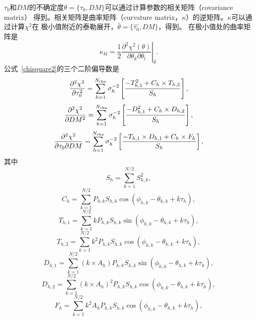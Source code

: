 $\tau_{0}$和$DM$的不确定度$\theta=\{\tau_0,DM\}$可以通过计算参数的相关矩阵（covariance matrix）
得到。相关矩阵是曲率矩阵（curvature matrix，$\kappa$）的逆矩阵。$\kappa$可以通过计算$\chi^2$在
极小值附近的泰勒展开，$\hat{\theta}=\{\hat{\tau_0},\hat{DM}\}$，得到。
%
在极小值处的曲率矩阵是
\begin{equation}
\kappa_{kl}=\left.\frac{1}{2}\frac{\partial^{2}\chi^{2}(\theta)}{\partial\theta_{k}\partial\theta_{l}}\right\rvert_{\hat{\theta}}.
\end{equation}
%
公式~\ref{chisquare2}的三个二阶偏导数是
%
\begin{equation}
\label{eq7}
\frac{\partial^2\chi^2}{\partial \tau_{0}^{2}}=\sum_{h=1}^{N_{\rm{chn}}}\sigma_{h}^{-2}\left[\frac{-T_{h,1}^{2}+C_{h}\times T_{h,2}}{S_{h}}\right],
\end{equation}
%
\begin{equation}
\frac{\partial^2\chi^2}{\partial DM^{2}}=\sum_{h=1}^{N_{\rm{chn}}}\sigma_{h}^{-2}\left[\frac{-D_{h,1}^{2}+C_{h}\times D_{h,2}}{S_{h}}\right],
\end{equation}
%
\begin{equation}
\label{eq9}
\frac{\partial^2\chi^2}{\partial \tau_{0} \partial DM}=\sum_{h=1}^{N_{\rm{chn}}}\sigma_{h}^{-2}\left[\frac{-T_{h,1}\times D_{h,1}+C_{h}\times F_{h}}{S_{h}}\right],
\end{equation}
%
其中
\begin{equation}
S_{h}=\sum_{k=1}^{N/2}S_{h,k}^2,
\end{equation}
\begin{equation}
C_{h}=\sum_{k=1}^{N/2}P_{h,k}S_{h,k}\cos(\phi_{h,k}-\theta_{h,k}+k\tau_{h}),
\end{equation}
\begin{equation}
T_{h,1}=\sum_{k=1}^{N/2}kP_{h,k}S_{h,k}\sin(\phi_{h,k}-\theta_{h,k}+k\tau_{h}),
\end{equation}
\begin{equation}
T_{h,2}=\sum_{k=1}^{N/2}k^{2}P_{h,k}S_{h,k}\cos(\phi_{h,k}-\theta_{h,k}+k\tau_{h}),
\end{equation}
\begin{equation}
D_{h,1}=\sum_{k=1}^{N/2}(k\times A_{h})P_{h,k}S_{h,k}\sin(\phi_{h,k}-\theta_{h,k}+k\tau_{h}),
\end{equation}
\begin{equation}
D_{h,2}=\sum_{k=1}^{N/2}(k\times A_{h})^{2}P_{h,k}S_{h,k}\cos(\phi_{h,k}-\theta_{h,k}+k\tau_{h}),
\end{equation}
\begin{equation}
F_{h}=\sum_{k=1}^{N/2}k^{2}A_{h}P_{h,k}S_{h,k}\cos(\phi_{h,k}-\theta_{h,k}+k\tau_{h}),
\end{equation}

